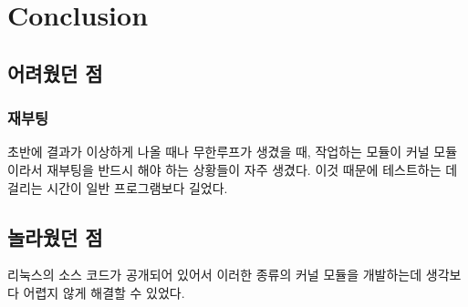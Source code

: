 \documentclass{report}
\begin{document}
\section{Conclusion}
\subsection{어려웠던 점}
\subsubsection{재부팅}
초반에 결과가 이상하게 나올 때나 무한루프가 생겼을 때, 작업하는 모듈이 커널 모듈이라서 재부팅을 반드시 해야 하는 상황들이 자주 생겼다. 이것 때문에 테스트하는 데 걸리는 시간이 일반 프로그램보다 길었다.


\subsection{놀라웠던 점}
리눅스의 소스 코드가 공개되어 있어서 이러한 종류의 커널 모듈을 개발하는데 생각보다 어렵지 않게 해결할 수 있었다.
\end{document}
